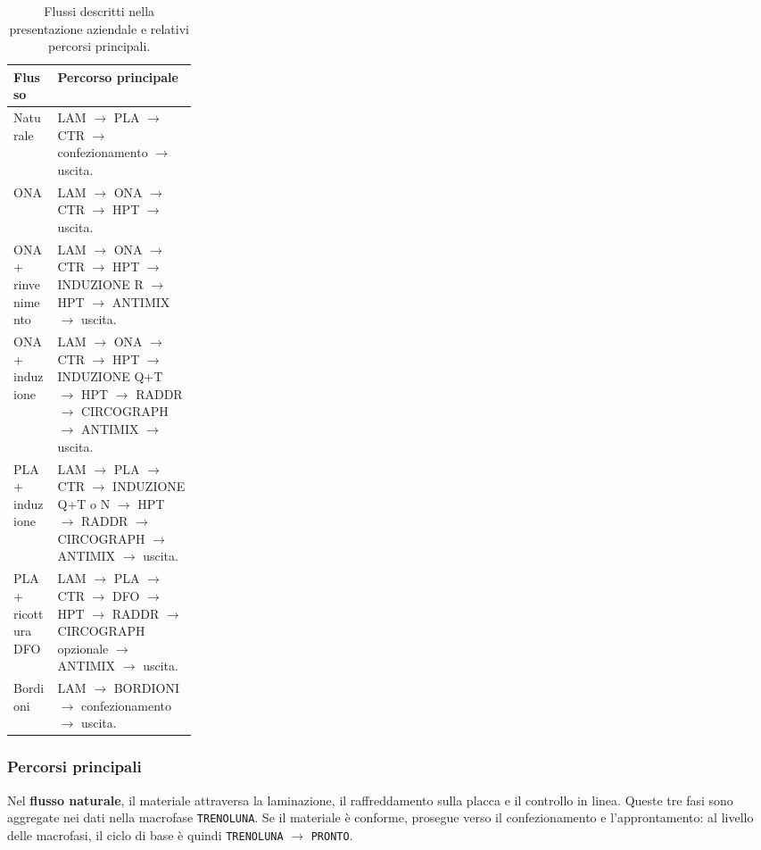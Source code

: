 \begin{table}[htbp]
\centering
\small
\begin{tabularx}{\linewidth}{@{}p{0.24\linewidth}>{\raggedright\arraybackslash}X@{}}
\toprule
\textbf{Flusso} & \textbf{Percorso principale} \\
\midrule
Naturale &
LAM $\rightarrow$ PLA $\rightarrow$ CTR $\rightarrow$ confezionamento $\rightarrow$ uscita. \\
\addlinespace
ONA &
LAM $\rightarrow$ ONA $\rightarrow$ CTR $\rightarrow$ HPT $\rightarrow$ uscita. \\
\addlinespace
ONA + rinvenimento &
LAM $\rightarrow$ ONA $\rightarrow$ CTR $\rightarrow$ HPT $\rightarrow$ INDUZIONE R $\rightarrow$ HPT $\rightarrow$ ANTIMIX $\rightarrow$ uscita. \\
\addlinespace
ONA + induzione &
LAM $\rightarrow$ ONA $\rightarrow$ CTR $\rightarrow$ HPT $\rightarrow$ INDUZIONE Q+T $\rightarrow$ HPT $\rightarrow$ RADDR $\rightarrow$ CIRCOGRAPH $\rightarrow$ ANTIMIX $\rightarrow$ uscita. \\
\addlinespace
PLA + induzione &
LAM $\rightarrow$ PLA $\rightarrow$ CTR $\rightarrow$ INDUZIONE Q+T o N $\rightarrow$ HPT $\rightarrow$ RADDR $\rightarrow$ CIRCOGRAPH $\rightarrow$ ANTIMIX $\rightarrow$ uscita. \\
\addlinespace
PLA + ricottura DFO &
LAM $\rightarrow$ PLA $\rightarrow$ CTR $\rightarrow$ DFO $\rightarrow$ HPT $\rightarrow$ RADDR $\rightarrow$ CIRCOGRAPH opzionale $\rightarrow$ ANTIMIX $\rightarrow$ uscita. \\
\addlinespace
Bordioni &
LAM $\rightarrow$ BORDIONI $\rightarrow$ confezionamento $\rightarrow$ uscita. \\
\bottomrule
\end{tabularx}
\caption{Flussi descritti nella presentazione aziendale e relativi percorsi principali.}
\label{tab:documented-base-cycles}
\end{table}

\subsubsection{Percorsi principali}

Nel \textbf{flusso naturale}, il materiale attraversa la laminazione, il raffreddamento sulla placca e il controllo in linea. Queste tre fasi sono aggregate nei dati nella macrofase \texttt{TRENOLUNA}. Se il materiale è conforme, prosegue verso il confezionamento e l'approntamento: al livello delle macrofasi, il ciclo di base è quindi \texttt{TRENOLUNA} $\rightarrow$ \texttt{PRONTO}.

